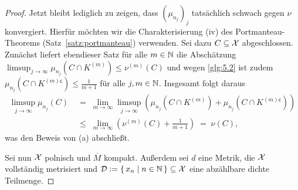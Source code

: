 \documentclass[../thesis/thesis.tex]{subfiles}
\begin{document}
\begin{proof}
		Jetzt bleibt lediglich zu zeigen, dass $(\mu_{n_j})_j$ tatsächlich schwach gegen $\nu$ konvergiert. 
		Hierfür möchten wir die Charakterisierung (iv) des Portmanteau-Theorems (Satz~\ref{satz:portmanteau}) verwenden.
		Sei dazu $C \subseteq \mathcal{X}$ abgeschlossen. Zunächst liefert ebendieser Satz für alle $m \in \mathbb{N}$ die 
		Abschätzung $\limsup_{j \to \infty} \mu_{n_j}(C \cap K^{(m)}) \leq \nu^{(m)}(C)$ und wegen \eqref{glg:5.2} ist 
		zudem $\mu_{n_j}(C \cap K^{(m) \mathsf{c}}) \leq  \frac{1}{m+1}$ für alle $j, m \in \mathbb{N}$. Insgesamt folgt daraus 
		\begin{align*}
			\limsup_{j \to \infty} \mu_{n_j}(C) \; &=    \; \lim_{m \to \infty} \limsup_{j \to \infty} 
			\left( \mu_{n_j}(C \cap K^{(m)}) + \mu_{n_j}(C \cap K^{(m) \mathsf{c}}) \right) \\
			&\leq \; \lim_{m \to \infty} \left( \nu^{(m)}(C) + \frac{1}{m+1} \right) 
			\; = \; \nu(C) \text{,}
		\end{align*}
		was den Beweis von (a) abschließt.
		
		Sei nun $\mathcal{X}$ polnisch und $\overline{M}$ kompakt. Außerdem sei $d$ eine Metrik, die $\mathcal{X}$ vollständig metrisiert 
		und $\mathcal{D} \vcentcolon = \left\{\, x_n \; \middle| \; n \in \mathbb{N} \,\right\} \subseteq \mathcal{X}$ eine abzählbare dichte Teilmenge.
		

\end{proof}
\end{document}
